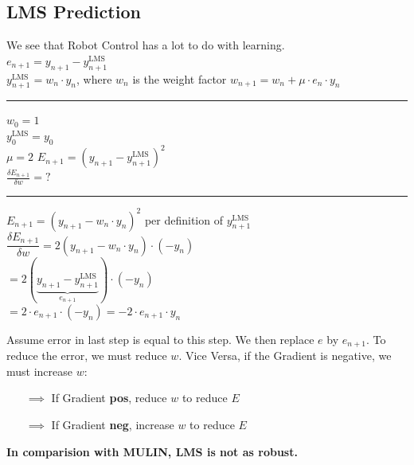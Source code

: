 \documentclass{exerciseBlue}
\begin{document}
\subsection{LMS Prediction}
We see that Robot Control has a lot to do with learning.\\
$e_{n+1} = y_{n+1} - y_{n+1}^{\text{LMS}}$\\
$y_{n+1}^{\text{LMS}} = w_n \cdot y_n$, where $w_n$ is the weight factor
$w_{n+1} = w_n + \mu \cdot e_n\cdot y_n$\\
\noindent\rule{\textwidth}{0.3pt}
$w_0 = 1$\\
$y_0^{\text{LMS}} = y_0$\\
$\mu = 2$
$E_{n+1} = (y_{n+1} - y_{n+1}^{\text{LMS}})^2$\\
$\frac{\delta E_{n+1}}{\delta w} = ?$\\
\noindent\rule{\textwidth}{0.3pt}
$E_{n+1} = (y_{n+1} - w_n\cdot y_n)^2$ per definition of $y_{n+1}^{\text{LMS}}$\\
$\dfrac{\delta E_{n+1}}{\delta w} = 2(y_{n+1}-w_n\cdot y_n)\cdot (-y_n)$\\
$ = 2(\underbrace{y_{n+1}-y_{n+1}^{\text{LMS}}}_{e_{n+1}})\cdot (-y_n)$\\
$ = 2\cdot e_{n+1}\cdot (-y_n) = -2\cdot e_{n+1}\cdot y_n$
\par Assume error in last step is equal to this step. We then replace $e$ by $e_{n+1}$. To reduce the error, we must reduce $w$. Vice Versa, if the Gradient is negative, we must increase $w$:
\begin{itemize}
	\item[$\implies$] If Gradient \textbf{pos}, reduce $w$ to reduce $E$
	\item[$\implies$] If Gradient \textbf{neg}, increase $w$ to reduce $E$
\end{itemize}
\textbf{In comparision with MULIN, LMS is not as robust.}
 \newpage
\end{document}
